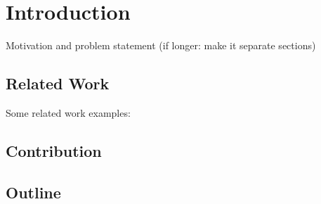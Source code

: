 
\chapter{Introduction}\label{ch:introduction}

Motivation and problem statement (if longer: make it separate sections)

\section{Related Work}\label{sec:related_work}

Some related work examples: \cite{HT21,HMW+20,VPG+20}

\section{Contribution}\label{sec:contribution}

\section{Outline}\label{sec:outline}

